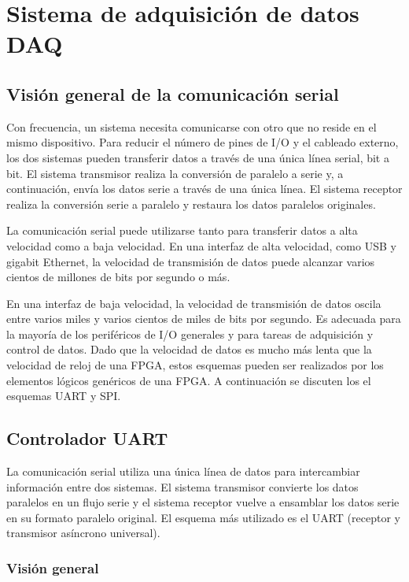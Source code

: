 \chapter{Sistema de adquisición de datos DAQ}

  \section{Visión general de la comunicación serial}

    Con frecuencia, un sistema necesita comunicarse con otro que no reside en el mismo dispositivo. Para reducir el número de pines de I/O y el cableado externo, los dos sistemas pueden transferir datos a través de una única línea serial, bit a bit. El sistema transmisor realiza la conversión de paralelo a serie y, a continuación, envía los datos serie a través de una única línea. El sistema receptor realiza la conversión serie a paralelo y restaura los datos paralelos originales.

    La comunicación serial puede utilizarse tanto para transferir datos a alta velocidad como a baja velocidad. En una interfaz de alta velocidad, como USB y gigabit Ethernet, la velocidad de transmisión de datos puede alcanzar varios cientos de millones de bits por segundo o más. 

    En una interfaz de baja velocidad, la velocidad de transmisión de datos oscila entre varios miles y varios cientos de miles de bits por segundo. Es adecuada para la mayoría de los periféricos de I/O generales y para tareas de adquisición y control de datos. Dado que la velocidad de datos es mucho más lenta que la velocidad de reloj de una FPGA, estos esquemas pueden ser realizados por los elementos lógicos genéricos de una FPGA. A continuación se discuten los el esquemas UART y SPI.

	\section{Controlador UART}

    La comunicación serial utiliza una única línea de datos para intercambiar información entre dos sistemas. El sistema transmisor convierte los datos paralelos en un flujo serie y el sistema receptor vuelve a ensamblar los datos serie en su formato paralelo original. El esquema más utilizado es el UART (receptor y transmisor asíncrono universal).

    \subsection{Visión general}

